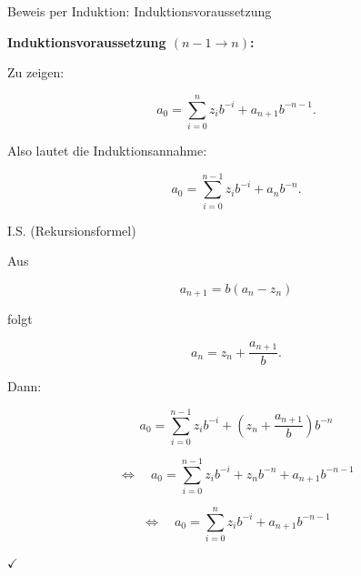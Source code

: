 \documentclass{beamer}
\begin{document}
\begin{frame}{Beweis per Induktion: Induktionsvoraussetzung}

\small

\textbf{Induktionsvoraussetzung \((n-1\rightarrow n)\):}

Zu zeigen:

\[
a_0=
\sum_{i=0}^{n} z_i b^{-i}
+
a_{n+1} b^{-n-1}.
\]

\vspace{0.5cm}

Also lautet die Induktionsannahme:

\[
a_0=
\sum_{i=0}^{n-1} z_i b^{-i}
+
a_n b^{-n}.
\]

\end{frame}

\begin{frame}{I.S. (Rekursionsformel)}

\scriptsize

Aus

\[
a_{n+1}=b(a_n-z_n)
\]

folgt

\[
a_n=z_n+\frac{a_{n+1}}{b}.
\]

\vspace{0.3cm}

Dann:

\[
a_0=
\sum_{i=0}^{n-1} z_i b^{-i}
+
\left(z_n+\frac{a_{n+1}}{b}\right)b^{-n}
\]

\vspace{0.3cm}

\[
\Longleftrightarrow\quad
a_0=
\sum_{i=0}^{n-1} z_i b^{-i}
+
z_n b^{-n}
+
a_{n+1}b^{-n-1}
\]

\vspace{0.3cm}

\[
\Longleftrightarrow\quad
a_0=
\sum_{i=0}^{n} z_i b^{-i}
+
a_{n+1}b^{-n-1}
\]

\hfill \(\checkmark\)

\end{frame}
\end{document}
